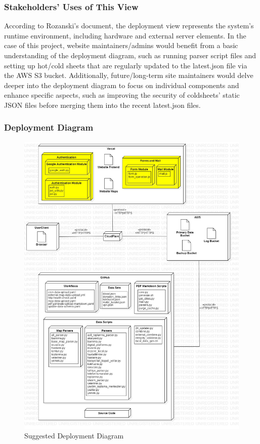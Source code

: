 \subsubsection{Stakeholders' Uses of This View}

According to Rozanski's document, the deployment view represents the system's runtime environment, including hardware and external server elements. In the case of this project, website maintainers/admins would benefit from a basic understanding of the deployment diagram, such as running parser script files and setting up hot/cold sheets that are regularly updated to the latest.json file via the AWS S3 bucket. Additionally, future/long-term site maintainers would delve deeper into the deployment diagram to focus on individual components and enhance specific aspects, such as improving the security of coldsheets' static JSON files before merging them into the recent latest.json files.

\subsubsection{Deployment Diagram}

\begin{figure}[H]
  \centering
  \includegraphics[width=\linewidth]{img/deployment-diagram-s5.jpg}
  \caption{Suggested Deployment Diagram}
\end{figure}

